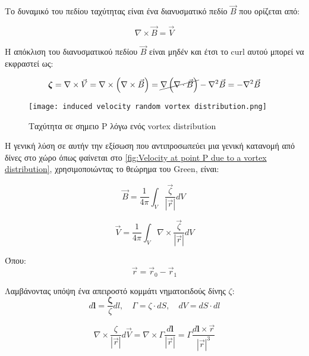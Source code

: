 Το  δυναμικό του πεδίου ταχύτητας είναι ένα διανυσματικό πεδίο $\vec{B}$ που ορίζεται από:

\begin{equation}
\nabla \times \vec{B} = \vec{V}
\end{equation}

Η απόκλιση του διανυσματικού πεδίου $\vec{B}$ είναι μηδέν και έτσι το \textlatin{curl} αυτού μπορεί να εκφραστεί ως:

\begin{equation}
\boldsymbol{\zeta} = \nabla \times \vec{V} = \nabla \times \left( \nabla \times \vec{B} \right) = \cancel{\nabla\left( \nabla \cdot \vec{B} \right)} - \nabla^{2}\vec{B} = - \nabla^{2}\vec{B}
\end{equation}

\begin{figure}[H]
    \centering
    \texttt{[image: induced velocity random vortex distribution.png]}
    \caption{Ταχύτητα σε σημειο \textlatin{P} λόγω ενός \textlatin{vortex distribution} \cite{katz2001}}
    \label{fig:Velocity at point P due to a vortex distribution}
\end{figure}

Η γενική λύση σε αυτήν την εξίσωση που αντιπροσωπεύει μια γενική κατανομή από δίνες στο χώρο όπως φαίνεται στο \autoref{fig:Velocity at point P due to a vortex distribution}, χρησιμοποιώντας το θεώρημα του \textlatin{Green}, είναι:

\begin{equation}
    \label{eq:vortexvelocity}
\vec{B} = \frac{1}{4\pi}\int_{V}^{}{\frac{\vec{\zeta}}{\left| \vec{r} \right|}dV\ }
\end{equation}

\begin{equation}
\vec{V} = \frac{1}{4\pi}\int_{V}^{}{\nabla \times \frac{\vec{\zeta}}{\left| \vec{r} \right|}dV}
\end{equation}

Όπου:
\[\vec{r} = {\vec{r}}_{0} - {\vec{r}}_{1}\]


Λαμβάνοντας υπόψη ένα απειροστό κομμάτι νηματοειδούς δίνης $\zeta$:
\begin{equation}
d\mathbf{l} = \frac{\boldsymbol{\zeta}}{\zeta}dl, \quad \Gamma = \zeta \cdot dS,\quad dV = dS \cdot dl
\end{equation}

\begin{equation}
    \label{eq:ininitesimalvortex}
\nabla \times \frac{\zeta}{\left| \vec{r} \right|}d\vec{V} = \nabla \times \Gamma\frac{d\mathbf{l}}{\left| \vec{r} \right|} = \Gamma\frac{d\mathbf{l} \times \vec{r}}{\left| \vec{r} \right|^{3}}
\end{equation}



